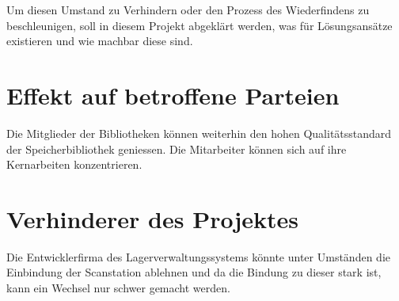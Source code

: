 Um diesen Umstand zu Verhindern oder den Prozess des Wiederfindens zu beschleunigen, soll in diesem Projekt abgeklärt werden, was für Lösungsansätze existieren und wie machbar diese sind.

\section{Effekt auf betroffene Parteien}
Die Mitglieder der Bibliotheken können weiterhin den hohen Qualitätsstandard der Speicherbibliothek geniessen.
Die Mitarbeiter können sich auf ihre Kernarbeiten konzentrieren.

\section{Verhinderer des Projektes}
Die Entwicklerfirma des Lagerverwaltungssystems könnte unter Umständen die Einbindung der Scanstation ablehnen und da die Bindung zu dieser stark ist, kann ein Wechsel nur schwer gemacht werden.
